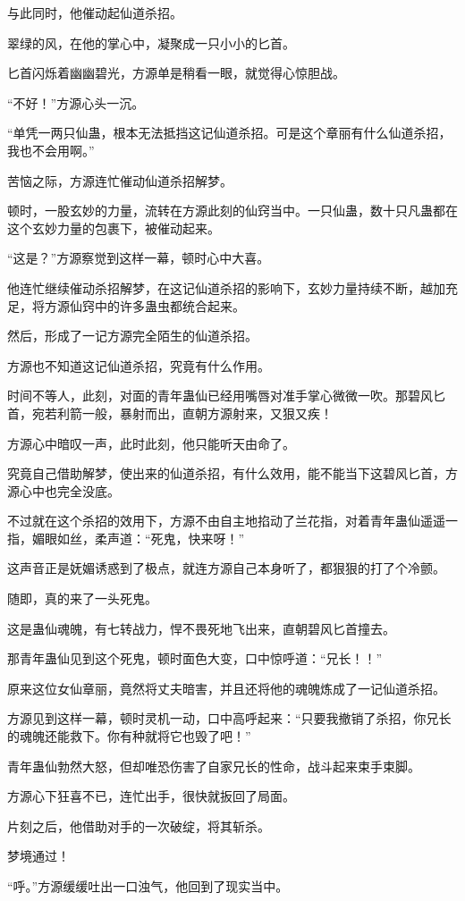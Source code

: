 \begin{this_body}
与此同时，他催动起仙道杀招。

翠绿的风，在他的掌心中，凝聚成一只小小的匕首。

匕首闪烁着幽幽碧光，方源单是稍看一眼，就觉得心惊胆战。

“不好！”方源心头一沉。

“单凭一两只仙蛊，根本无法抵挡这记仙道杀招。可是这个章丽有什么仙道杀招，我也不会用啊。”

苦恼之际，方源连忙催动仙道杀招解梦。

顿时，一股玄妙的力量，流转在方源此刻的仙窍当中。一只仙蛊，数十只凡蛊都在这个玄妙力量的包裹下，被催动起来。

“这是？”方源察觉到这样一幕，顿时心中大喜。

他连忙继续催动杀招解梦，在这记仙道杀招的影响下，玄妙力量持续不断，越加充足，将方源仙窍中的许多蛊虫都统合起来。

然后，形成了一记方源完全陌生的仙道杀招。

方源也不知道这记仙道杀招，究竟有什么作用。

时间不等人，此刻，对面的青年蛊仙已经用嘴唇对准手掌心微微一吹。那碧风匕首，宛若利箭一般，暴射而出，直朝方源射来，又狠又疾！

方源心中暗叹一声，此时此刻，他只能听天由命了。

究竟自己借助解梦，使出来的仙道杀招，有什么效用，能不能当下这碧风匕首，方源心中也完全没底。

不过就在这个杀招的效用下，方源不由自主地掐动了兰花指，对着青年蛊仙遥遥一指，媚眼如丝，柔声道：“死鬼，快来呀！”

这声音正是妩媚诱惑到了极点，就连方源自己本身听了，都狠狠的打了个冷颤。

随即，真的来了一头死鬼。

这是蛊仙魂魄，有七转战力，悍不畏死地飞出来，直朝碧风匕首撞去。

那青年蛊仙见到这个死鬼，顿时面色大变，口中惊呼道：“兄长！！”

原来这位女仙章丽，竟然将丈夫暗害，并且还将他的魂魄炼成了一记仙道杀招。

方源见到这样一幕，顿时灵机一动，口中高呼起来：“只要我撤销了杀招，你兄长的魂魄还能救下。你有种就将它也毁了吧！”

青年蛊仙勃然大怒，但却唯恐伤害了自家兄长的性命，战斗起来束手束脚。

方源心下狂喜不已，连忙出手，很快就扳回了局面。

片刻之后，他借助对手的一次破绽，将其斩杀。

梦境通过！

“呼。”方源缓缓吐出一口浊气，他回到了现实当中。


\end{this_body}
